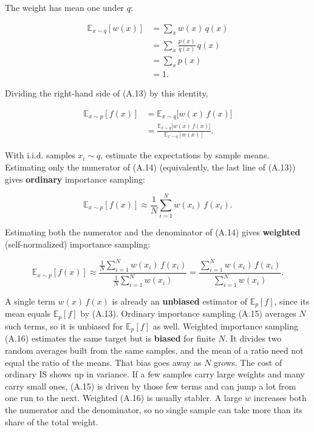 The weight has mean one under $q$:

\[
\begin{aligned}
\mathbb{E}_{x\sim q}[w(x)]
&=
\sum_x w(x)\, q(x)
\\
&=
\sum_x \frac{p(x)}{q(x)}\, q(x)
\\
&=
\sum_x p(x)
\\
&=
1.
\end{aligned}
\]

Dividing the right-hand side of (A.13) by this identity,

\begin{equation}
\begin{aligned}
\mathbb{E}_{x\sim p}[f(x)]
&=
\mathbb{E}_{x\sim q}\bigl[w(x)\, f(x)\bigr]
\\
&=
\frac{\mathbb{E}_{x\sim q}\bigl[w(x)\, f(x)\bigr]}{\mathbb{E}_{x\sim q}[w(x)]}.
\end{aligned}
\tag{A.14}
\end{equation}

With i.i.d. samples $x_i\sim q$, estimate the expectations by sample means. Estimating only the numerator of (A.14) (equivalently, the last line of (A.13)) gives \textbf{ordinary} importance sampling:

\begin{equation}
\mathbb{E}_{x\sim p}[f(x)]
\approx
\frac{1}{N}\sum_{i=1}^{N} w(x_i)\, f(x_i).
\tag{A.15}
\end{equation}

Estimating both the numerator and the denominator of (A.14) gives \textbf{weighted} (self-normalized) importance sampling:

\begin{equation}
\mathbb{E}_{x\sim p}[f(x)]
\approx
\frac{\tfrac{1}{N}\sum_{i=1}^{N} w(x_i)\, f(x_i)}
{\tfrac{1}{N}\sum_{i=1}^{N} w(x_i)}
=
\frac{\sum_{i=1}^{N} w(x_i)\, f(x_i)}{\sum_{i=1}^{N} w(x_i)}.
\tag{A.16}
\end{equation}

A single term $w(x)\,f(x)$ is already an \textbf{unbiased} estimator of $\mathbb{E}_p[f]$, since its mean equals $\mathbb{E}_p[f]$ by (A.13). Ordinary importance sampling (A.15) averages $N$ such terms, so it is unbiased for $\mathbb{E}_p[f]$ as well. Weighted importance sampling (A.16) estimates the same target but is \textbf{biased} for finite $N$. It divides two random averages built from the same samples, and the mean of a ratio need not equal the ratio of the means. That bias goes away as $N$ grows. The cost of ordinary IS shows up in variance. If a few samples carry large weights and many carry small ones, (A.15) is driven by those few terms and can jump a lot from one run to the next. Weighted (A.16) is usually stabler. A large $w$ increases both the numerator and the denominator, so no single sample can take more than its share of the total weight.

